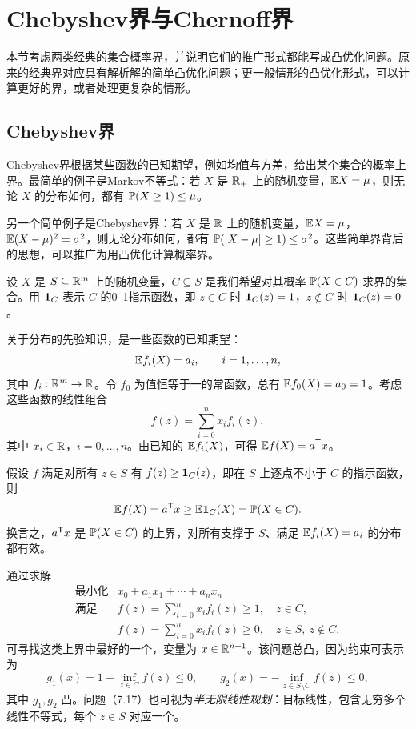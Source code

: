 \section{Chebyshev界与Chernoff界}
本节考虑两类经典的集合概率界，并说明它们的推广形式都能写成凸优化问题。原来的经典界对应具有解析解的简单凸优化问题；更一般情形的凸优化形式，可以计算更好的界，或者处理更复杂的情形。

\subsection{Chebyshev界}
Chebyshev界根据某些函数的已知期望，例如均值与方差，给出某个集合的概率上界。最简单的例子是Markov不等式：若 $X$ 是 $\mathbb R_+$ 上的随机变量，$\mathbb E X=\mu$，则无论 $X$ 的分布如何，都有 $\mathbb P(X\ge1)\le\mu$。

另一个简单例子是Chebyshev界：若 $X$ 是 $\mathbb R$ 上的随机变量，$\mathbb E X=\mu$，$\mathbb E(X-\mu)^2=\sigma^2$，则无论分布如何，都有 $\mathbb P(\left\lvert X-\mu\right\rvert\ge1)\le\sigma^2$。这些简单界背后的思想，可以推广为用凸优化计算概率界。

设 $X$ 是 $S\subseteq\mathbb R^m$ 上的随机变量，$C\subseteq S$ 是我们希望对其概率 $\mathbb P(X\in C)$ 求界的集合。用 $\mathbf 1_C$ 表示 $C$ 的0--1指示函数，即 $z\in C$ 时 $\mathbf 1_C(z)=1$，$z\notin C$ 时 $\mathbf 1_C(z)=0$。

关于分布的先验知识，是一些函数的已知期望：
\[
 \mathbb E f_i(X)=a_i,\qquad i=1,\ldots,n,
\]
其中 $f_i:\mathbb R^m\to\mathbb R$。令 $f_0$ 为值恒等于一的常函数，总有 $\mathbb E f_0(X)=a_0=1$。考虑这些函数的线性组合
\[
 f(z)=\sum_{i=0}^nx_if_i(z),
\]
其中 $x_i\in\mathbb R$，$i=0,\ldots,n$。由已知的 $\mathbb E f_i(X)$，可得 $\mathbb E f(X)=a^{\mathsf T}x$。

假设 $f$ 满足对所有 $z\in S$ 有 $f(z)\ge\mathbf 1_C(z)$，即在 $S$ 上逐点不小于 $C$ 的指示函数，则
\[
 \mathbb E f(X)=a^{\mathsf T}x\ge\mathbb E\mathbf 1_C(X)=\mathbb P(X\in C).
\]
换言之，$a^{\mathsf T}x$ 是 $\mathbb P(X\in C)$ 的上界，对所有支撑于 $S$、满足 $\mathbb E f_i(X)=a_i$ 的分布都有效。

通过求解
\begin{equation}
\begin{array}{ll}
\text{最小化}&x_0+a_1x_1+\cdots+a_nx_n\\
\text{满足}&f(z)=\sum_{i=0}^nx_if_i(z)\ge1,\quad z\in C,\\
&f(z)=\sum_{i=0}^nx_if_i(z)\ge0,\quad z\in S,\ z\notin C,
\end{array}\tag{7.17}
\end{equation}
可寻找这类上界中最好的一个，变量为 $x\in\mathbb R^{n+1}$。该问题总凸，因为约束可表示为
\[
 g_1(x)=1-\inf_{z\in C}f(z)\le0,\qquad
 g_2(x)=-\inf_{z\in S\setminus C}f(z)\le0,
\]
其中 $g_1,g_2$ 凸。问题（7.17）也可视为\emph{半无限线性规划}：目标线性，包含无穷多个线性不等式，每个 $z\in S$ 对应一个。

